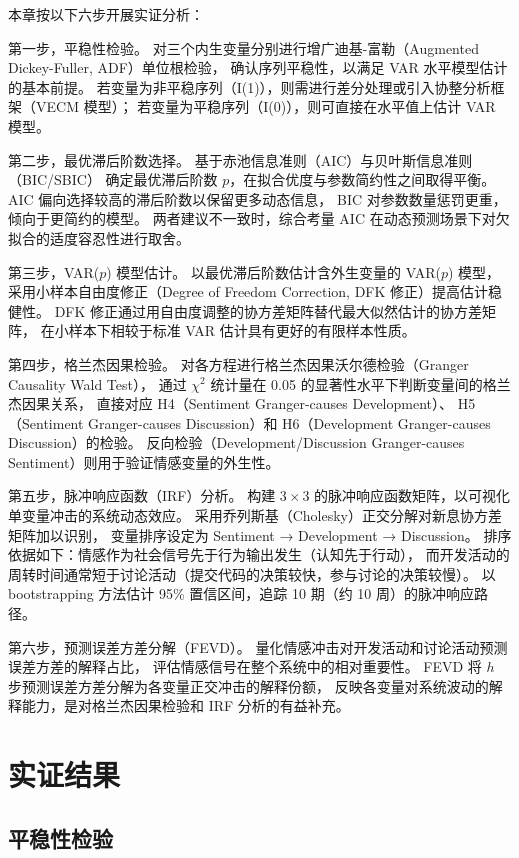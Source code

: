 \documentclass[
    type = master, %
    degree = professional,        %
    decl-page,  %
    twoside,                %
    fontset = fandol %
  ]{njuthesis}
\begin{document}
本章按以下六步开展实证分析：

第一步，平稳性检验。
对三个内生变量分别进行增广迪基-富勒（Augmented Dickey-Fuller, ADF）单位根检验，
确认序列平稳性，以满足 VAR 水平模型估计的基本前提。
若变量为非平稳序列（I(1)），则需进行差分处理或引入协整分析框架（VECM 模型）；
若变量为平稳序列（I(0)），则可直接在水平值上估计 VAR 模型。

第二步，最优滞后阶数选择。
基于赤池信息准则（AIC）与贝叶斯信息准则（BIC/SBIC）
确定最优滞后阶数 $p$，在拟合优度与参数简约性之间取得平衡。
AIC 偏向选择较高的滞后阶数以保留更多动态信息，
BIC 对参数数量惩罚更重，倾向于更简约的模型。
两者建议不一致时，综合考量 AIC 在动态预测场景下对欠拟合的适度容忍性进行取舍。

第三步，VAR($p$) 模型估计。
以最优滞后阶数估计含外生变量的 VAR($p$) 模型，
采用小样本自由度修正（Degree of Freedom Correction, DFK 修正）提高估计稳健性。
DFK 修正通过用自由度调整的协方差矩阵替代最大似然估计的协方差矩阵，
在小样本下相较于标准 VAR 估计具有更好的有限样本性质。

第四步，格兰杰因果检验。
对各方程进行格兰杰因果沃尔德检验（Granger Causality Wald Test），
通过 $\chi^2$ 统计量在 0.05 的显著性水平下判断变量间的格兰杰因果关系，
直接对应 H4（Sentiment Granger-causes Development）、
H5（Sentiment Granger-causes Discussion）和 H6（Development Granger-causes Discussion）的检验。
反向检验（Development/Discussion Granger-causes Sentiment）则用于验证情感变量的外生性。

第五步，脉冲响应函数（IRF）分析。
构建 $3 \times 3$ 的脉冲响应函数矩阵，以可视化单变量冲击的系统动态效应。
采用乔列斯基（Cholesky）正交分解对新息协方差矩阵加以识别，
变量排序设定为 Sentiment → Development → Discussion。
排序依据如下：情感作为社会信号先于行为输出发生（认知先于行动），
而开发活动的周转时间通常短于讨论活动（提交代码的决策较快，参与讨论的决策较慢）。
以 bootstrapping 方法估计 95\% 置信区间，追踪 10 期（约 10 周）的脉冲响应路径。

第六步，预测误差方差分解（FEVD）。
量化情感冲击对开发活动和讨论活动预测误差方差的解释占比，
评估情感信号在整个系统中的相对重要性。
FEVD 将 $h$ 步预测误差方差分解为各变量正交冲击的解释份额，
反映各变量对系统波动的解释能力，是对格兰杰因果检验和 IRF 分析的有益补充。


\section{实证结果}

\subsection{平稳性检验}
\end{document}
